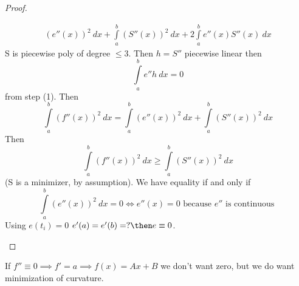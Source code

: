 \begin{proof}
\begin{enumerate}
\begin{align*}
                                                               \left(e''(x)\right)^2 \ dx 
                                                               + \int\limits_{a}^{b}
                                                               \left(S''(x)\right)^2 \ dx + 2
                                                  \int\limits_{a}^{b} e''(x)S''(x) \ dx
            \end{align*} 
            S is piecewise poly of degree $ \leq 3 $. 
            Then $ h = S'' $ piecewise linear then 
            \[
            \int\limits_{a}^{b} e''h \ dx= 0
        \] from step (1). 
        Then 
        \[
            \int\limits_{a}^{b} \left(f''(x)\right)^2 \ dx = \int\limits_{a}^{b}
            \left(e''(x)\right)^2\ dx +
            \int\limits_{a}^{b} \left(S''(x)\right)^2 \ dx
        \]
        Then 
        \[
            \int\limits_{a}^{b} \left(f''(x)\right)^2 \ dx \geq \int\limits_{a}^{b}
            \left(S''(x)\right)^2 \ dx 
    \] (S is a minimizer, by assumption). 
    We have equality if and only if 
    \[
        \int\limits_{a}^{b} \left(e''(x)\right)^2 \ dx = 0 \iff e''(x) = 0 \text{ because } e'' \text{ is continuous }  
    \] 
    Using $ e(t_i) = 0 $ $ e'(a) = e'(b) = ? \then e \equiv 0 $.  
    \end{enumerate}
\end{proof}
If $ f'' \equiv 0 \implies f' = a \implies f(x) = Ax + B$ we don't want zero, but we do
want minimization of curvature. 



